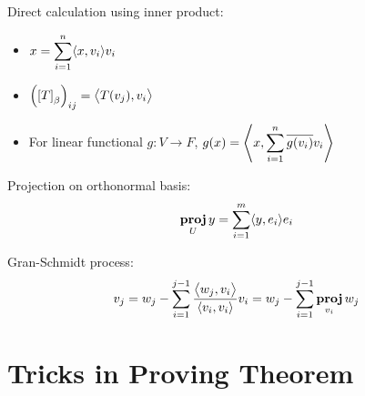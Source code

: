 \begin{example}
    Direct calculation using inner product:
    \begin{itemize}
    \item $\displaystyle x = \sum_{i=1}^n \innerproduct{x}{v_i} v_i$
    \item $\mleft(\coordinate{T}_\beta\mright)_{ij} = \innerproduct{T(v_j)}{v_i}$
    \item For linear functional $g: V \rightarrow F$, $g(x) = \innerproduct{x}{\sum_{i=1}^n \conjugate{g(v_i)} v_i}$
    \end{itemize}
    
    Projection on orthonormal basis:
    \begin{equation}
        \projection{y}{U} = \sum_{i=1}^{m} \innerproduct{y}{e_i} e_i
    \end{equation}
    
    Gran-Schmidt process:
    \begin{equation}
        v_j = w_j - \sum_{i=1}^{j-1} \frac{\innerproduct{w_j}{v_i}}{\innerproduct{v_i}{v_i}} v_i = w_j - \sum_{i=1}^{j-1} \projection{w_j}{v_i}
    \end{equation}
\end{example}



    





\section{Tricks in Proving Theorem}

